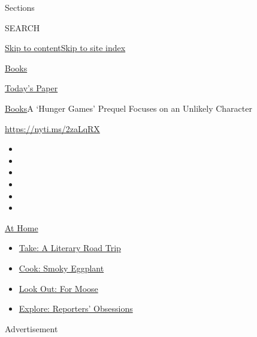 Sections

SEARCH

\protect\hyperlink{site-content}{Skip to
content}\protect\hyperlink{site-index}{Skip to site index}

\href{https://www.nytimes.com/section/books}{Books}

\href{https://myaccount.nytimes.com/auth/login?response_type=cookie\&client_id=vi}{}

\href{https://www.nytimes.com/section/todayspaper}{Today's Paper}

\href{/section/books}{Books}\textbar{}A `Hunger Games' Prequel Focuses
on an Unlikely Character

\url{https://nyti.ms/2zaLqRX}

\begin{itemize}
\item
\item
\item
\item
\item
\item
\end{itemize}

\href{https://www.nytimes.com/spotlight/at-home?action=click\&pgtype=Article\&state=default\&region=TOP_BANNER\&context=at_home_menu}{At
Home}

\begin{itemize}
\tightlist
\item
  \href{https://www.nytimes.com/2020/07/28/books/time-for-a-literary-road-trip.html?action=click\&pgtype=Article\&state=default\&region=TOP_BANNER\&context=at_home_menu}{Take:
  A Literary Road Trip}
\item
  \href{https://www.nytimes.com/2020/07/29/magazine/bored-with-your-home-cooking-some-smoky-eggplant-will-fix-that.html?action=click\&pgtype=Article\&state=default\&region=TOP_BANNER\&context=at_home_menu}{Cook:
  Smoky Eggplant}
\item
  \href{https://www.nytimes.com/2020/07/27/travel/moose-michigan-isle-royale.html?action=click\&pgtype=Article\&state=default\&region=TOP_BANNER\&context=at_home_menu}{Look
  Out: For Moose}
\item
  \href{https://www.nytimes.com/interactive/2020/at-home/even-more-reporters-editors-diaries-lists-recommendations.html?action=click\&pgtype=Article\&state=default\&region=TOP_BANNER\&context=at_home_menu}{Explore:
  Reporters' Obsessions}
\end{itemize}

Advertisement

